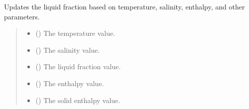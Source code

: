 \documentclass[a4paper,11pt,english,openany]{sphinxmanual}
\begin{document}
\begin{fulllineitems}
\label{\detokenize{api/spyice.update_physical_values:src.spyice.update_physical_values.update_liquid_fraction_buffo}}
\pysigstartsignatures
\pysiglinewithargsret
{}
{\sphinxparamcomma {}\sphinxparamcomma {}\sphinxparamcomma {}\sphinxparamcomma {}\sphinxparamcomma {}\sphinxparamcomma {}\sphinxparamcomma {}\sphinxparamcomma {}}
{}
\pysigstopsignatures
\sphinxAtStartPar
Updates the liquid fraction based on temperature, salinity, enthalpy, and other parameters.
\begin{quote}\begin{description}
\begin{itemize}
\item {} 
\sphinxAtStartPar
{} () \textendash{} The temperature value.

\item {} 
\sphinxAtStartPar
{} () \textendash{} The salinity value.

\item {} 
\sphinxAtStartPar
{} () \textendash{} The liquid fraction value.

\item {} 
\sphinxAtStartPar
{} () \textendash{} The enthalpy value.

\item {} 
\sphinxAtStartPar
{} () \textendash{} The solid enthalpy value.


\end{itemize}
\end{description}
\end{quote}
\end{fulllineitems}
\end{document}
